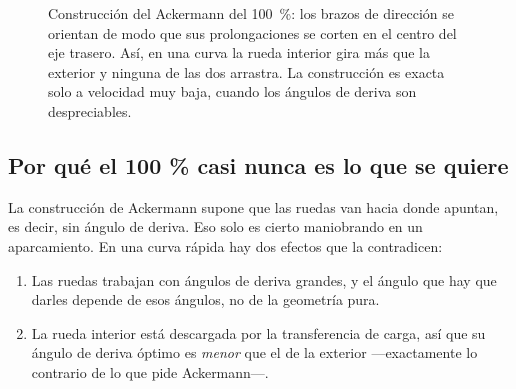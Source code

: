 \begin{figure}[htbp]
\centering
{}
\caption[Construcción de Ackermann]{Construcción del Ackermann del
\SI{100}{\percent}: los brazos de dirección se orientan de modo que sus
prolongaciones se corten en el centro del eje trasero. Así, en una curva la
rueda interior gira más que la exterior y ninguna de las dos arrastra. La
construcción es exacta solo a velocidad muy baja, cuando los ángulos de deriva
son despreciables.}
\label{fig:direccion:ackermann}
\end{figure}

\subsection{Por qué el 100 \% casi nunca es lo que se quiere}

La construcción de Ackermann supone que las ruedas van hacia donde apuntan, es
decir, sin ángulo de deriva. Eso solo es cierto maniobrando en un aparcamiento.
En una curva rápida hay dos efectos que la contradicen:

\begin{enumerate}
  \item Las ruedas trabajan con ángulos de deriva grandes, y el ángulo que hay
        que darles depende de esos ángulos, no de la geometría pura.
  \item La rueda interior está descargada por la transferencia de carga, así que
        su ángulo de deriva óptimo es \emph{menor} que el de la exterior
        ---exactamente lo contrario de lo que pide Ackermann---.
\end{enumerate}

